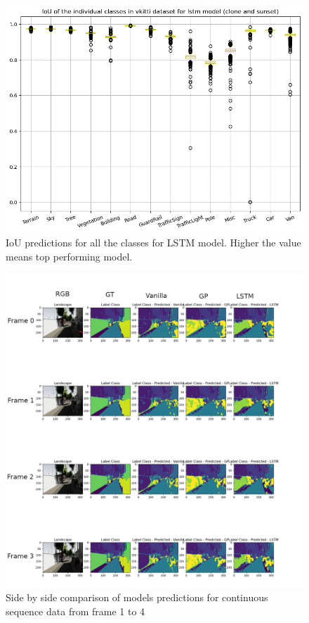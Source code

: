	\begin{figure}
		\centering
		\includegraphics[width=13cm]{images/IoU_lstm_two_class.png}
		\caption{IoU predictions for all the classes for LSTM model. Higher the value means top performing model.}
		\label{fig:performance_metric_three_classes}
	\end{figure}


	\begin{figure}
		\centering
		\includegraphics[width=19cm]{images/continuous_sequence_data1.png}
		\caption{Side by side comparison of models predictions for continuous sequence data from frame 1 to 4}
		\label{fig:performance_metric_three_classes}
	\end{figure}

